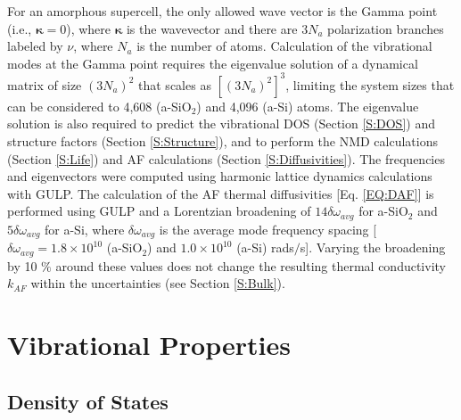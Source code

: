 \documentclass[aps,prb,onecolumn,preprint,superscriptaddress,footinbib,amsmath,amssymb,floatfix]{revtex4}
\begin{document}
For an amorphous supercell, 
the only allowed wave vector is the Gamma point 
(i.e., $\pmb{\kappa}=0$),  
where $\pmb{\kappa}$ is the wavevector and there are $3N_a$ 
polarization 
branches labeled by $\nu$, where $N_a$ is the number of atoms. 
Calculation of the vibrational modes at the Gamma point  
requires the eigenvalue solution of a dynamical matrix of size 
$(3N_a)^2$ that scales as $[(3N_a)^2]^3$, limiting the system 
sizes that can be considered to 4,608 (a-SiO$_2$) and 4,096 (a-Si) 
atoms. 
The eigenvalue solution is also required to predict the vibrational 
DOS (Section \ref{S:DOS}) and structure factors 
(Section \ref{S:Structure}), and to perform the NMD calculations  
(Section \ref{S:Life})  
and AF calculations (Section \ref{S:Diffusivities}). 
The frequencies and eigenvectors were computed using harmonic
lattice dynamics calculations with GULP.\cite{gale_general_2003} 
The calculation of the AF thermal diffusivities 
[Eq. \eqref{EQ:DAF}] is performed using GULP and a Lorentzian 
broadening of $14\delta\omega_{avg}$ for a-SiO$_2$ and 
$5\delta\omega_{avg}$ for a-Si, 
where $\delta\omega_{avg}$ is the average mode 
frequency spacing 
[$\delta\omega_{avg} = 1.8 \times 10^{10}$ (a-SiO$_2$) 
and $1.0 \times 10^{10}$ (a-Si) rads$/$s].
\cite{feldman_thermal_1993,feldman_numerical_1999}  
Varying the broadening by 10 $\%$ around these values does not 
change the resulting thermal conductivity $k_{AF}$ within the 
uncertainties
(see Section \ref{S:Bulk}).

\section{\label{S:Vibrational}Vibrational Properties}

\subsection{\label{S:DOS}Density of States}
\end{document}
